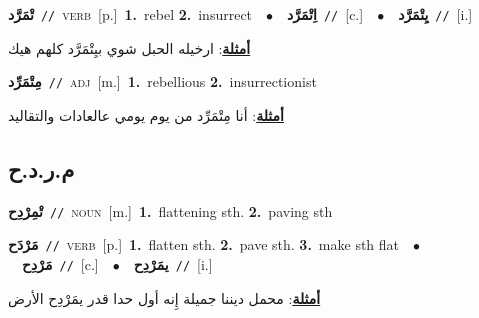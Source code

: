 \documentclass[10pt,a4paper,twoside]{article} %
\begin{document}
\begin{multicols}{2}
{\setlength\topsep{0pt}\textbf{\foreignlanguage{arabic}{تْمَرَّد}}\ {\color{gray}\texttt{//}\color{black}}\ \textsc{verb}\ [p.]\ \textbf{1.}~rebel  \textbf{2.}~insurrect\ \ $\bullet$\ \ \setlength\topsep{0pt}\textbf{\foreignlanguage{arabic}{اِتْمَرَّد}}\ {\color{gray}\texttt{//}\color{black}}\ [c.]\ \ $\bullet$\ \ \setlength\topsep{0pt}\textbf{\foreignlanguage{arabic}{يِتْمَرَّد}}\ {\color{gray}\texttt{//}\color{black}}\ [i.]\  \begin{flushright}\color{gray}\foreignlanguage{arabic}{\textbf{\underline{\foreignlanguage{arabic}{أمثلة}}}: ارخيله الحبل شوي بيِتْمَرَّد كلهم هيك}\end{flushright}\color{black}} \vspace{2mm}

{\setlength\topsep{0pt}\textbf{\foreignlanguage{arabic}{مِتْمَرِّد}}\ {\color{gray}\texttt{//}\color{black}}\ \textsc{adj}\ [m.]\ \textbf{1.}~rebellious  \textbf{2.}~insurrectionist\  \begin{flushright}\color{gray}\foreignlanguage{arabic}{\textbf{\underline{\foreignlanguage{arabic}{أمثلة}}}: أنا مِتْمَرِّد من يوم يومي عالعادات والتقاليد}\end{flushright}\color{black}} \vspace{2mm}

\vspace{-3mm}
\subsection*{\color{blue}\foreignlanguage{arabic}{م.ر.د.ح}\color{blue}{}} 

{\setlength\topsep{0pt}\textbf{\foreignlanguage{arabic}{تْمِرْدِح}}\ {\color{gray}\texttt{//}\color{black}}\ \textsc{noun}\ [m.]\ \textbf{1.}~flattening sth.  \textbf{2.}~paving sth\ } \vspace{2mm}

{\setlength\topsep{0pt}\textbf{\foreignlanguage{arabic}{مَرْدَح}}\ {\color{gray}\texttt{//}\color{black}}\ \textsc{verb}\ [p.]\ \textbf{1.}~flatten sth.  \textbf{2.}~pave sth.  \textbf{3.}~make sth flat\ \ $\bullet$\ \ \setlength\topsep{0pt}\textbf{\foreignlanguage{arabic}{مَرْدِح}}\ {\color{gray}\texttt{//}\color{black}}\ [c.]\ \ $\bullet$\ \ \setlength\topsep{0pt}\textbf{\foreignlanguage{arabic}{يمَرْدِح}}\ {\color{gray}\texttt{//}\color{black}}\ [i.]\  \begin{flushright}\color{gray}\foreignlanguage{arabic}{\textbf{\underline{\foreignlanguage{arabic}{أمثلة}}}: محمل ديننا جميلة إِنه أول حدا قدر يمَرْدِح الأرض}\end{flushright}\color{black}} \vspace{2mm}


\end{multicols}
\end{document}
